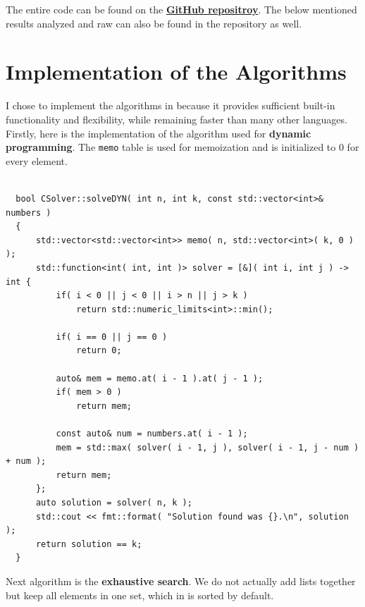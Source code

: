 \documentclass[11pt]{article}
\begin{document}
\maketitle

The entire code can be found on the \href{https://github.com/Edelwy/approximation-algorithms}{\textbf{GitHub repositroy}}. The below mentioned results analyzed and raw can also be found in the repository as well.

\section{Implementation of the Algorithms}

I chose to implement the algorithms in \cpp because it provides sufficient built-in functionality and flexibility, while remaining faster than many other languages. Firstly, here is the implementation of the algorithm used for \textbf{dynamic programming}. The \texttt{memo} table is used for memoization and is initialized to $0$ for every element.

\begin{verbatim}

  bool CSolver::solveDYN( int n, int k, const std::vector<int>& numbers )
  {
      std::vector<std::vector<int>> memo( n, std::vector<int>( k, 0 ) );
      std::function<int( int, int )> solver = [&]( int i, int j ) -> int {
          if( i < 0 || j < 0 || i > n || j > k )
              return std::numeric_limits<int>::min();
  
          if( i == 0 || j == 0 )
              return 0;
  
          auto& mem = memo.at( i - 1 ).at( j - 1 );
          if( mem > 0 ) 
              return mem;
  
          const auto& num = numbers.at( i - 1 );
          mem = std::max( solver( i - 1, j ), solver( i - 1, j - num ) + num );
          return mem;
      };
      auto solution = solver( n, k );
      std::cout << fmt::format( "Solution found was {}.\n", solution );
      return solution == k;
  }
\end{verbatim}

Next algorithm is the \textbf{exhaustive search}. We do not actually add lists together but keep all elements in one set, which in \cpp is sorted by default.
\end{document}
